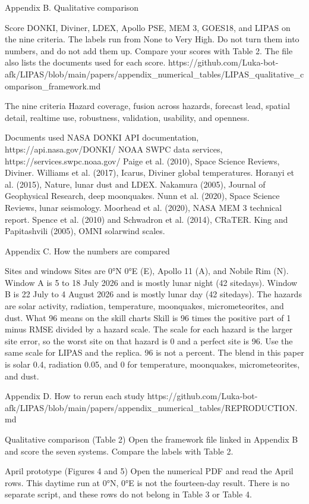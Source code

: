 Appendix B. Qualitative comparison

Score DONKI, Diviner, LDEX, Apollo PSE, MEM 3, GOES18, and LIPAS on the nine criteria. The labels run from None to Very High. Do not turn them into numbers, and do not add them up. Compare your scores with Table 2. The file also lists the documents used for each score. https://github.com/Luka-bot-afk/LIPAS/blob/main/papers/appendix\_numerical\_tables/LIPAS\_qualitative\_comparison\_framework.md

The nine criteria Hazard coverage, fusion across hazards, forecast lead, spatial detail, realtime use, robustness, validation, usability, and openness.

Documents used NASA DONKI API documentation, https://api.nasa.gov/DONKI/ NOAA SWPC data services, https://services.swpc.noaa.gov/ Paige et al. (2010), Space Science Reviews, Diviner. Williams et al. (2017), Icarus, Diviner global temperatures. Horanyi et al. (2015), Nature, lunar dust and LDEX. Nakamura (2005), Journal of Geophysical Research, deep moonquakes. Nunn et al. (2020), Space Science Reviews, lunar seismology. Moorhead et al. (2020), NASA MEM 3 technical report. Spence et al. (2010) and Schwadron et al. (2014), CRaTER. King and Papitashvili (2005), OMNI solarwind scales.

Appendix C. How the numbers are compared

Sites and windows Sites are 0°N 0°E (E), Apollo 11 (A), and Nobile Rim (N). Window A is 5 to 18 July 2026 and is mostly lunar night (42 sitedays). Window B is 22 July to 4 August 2026 and is mostly lunar day (42 sitedays). The hazards are solar activity, radiation, temperature, moonquakes, micrometeorites, and dust. What 96 means on the skill charts Skill is 96 times the positive part of 1 minus RMSE divided by a hazard scale. The scale for each hazard is the larger site error, so the worst site on that hazard is 0 and a perfect site is 96. Use the same scale for LIPAS and the replica. 96 is not a percent. The blend in this paper is solar 0.4, radiation 0.05, and 0 for temperature, moonquakes, micrometeorites, and dust.

Appendix D. How to rerun each study https://github.com/Luka-bot-afk/LIPAS/blob/main/papers/appendix\_numerical\_tables/REPRODUCTION.md

Qualitative comparison (Table 2) Open the framework file linked in Appendix B and score the seven systems. Compare the labels with Table 2.

April prototype (Figures 4 and 5) Open the numerical PDF and read the April rows. This daytime run at 0°N, 0°E is not the fourteen-day result. There is no separate script, and these rows do not belong in Table 3 or Table 4.

